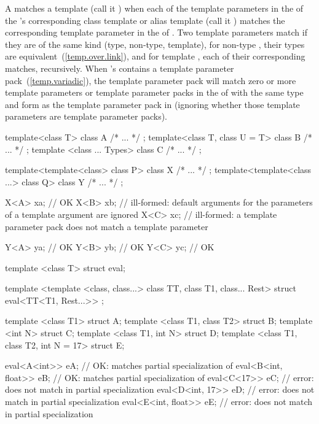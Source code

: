 \pnum A  matches a template
 (call it ) when each of the template
parameters in the  of the
's corresponding class template or alias template (call
it ) matches the corresponding template parameter in the
 of . 
Two template parameters match if they are of the same kind (type, non-type, template),
for non-type , their types are
equivalent~(\ref{temp.over.link}), and for template ,
each of their corresponding  matches, recursively.
When 's  contains a template parameter
pack~(\ref{temp.variadic}), the template parameter pack will match zero or more template
parameters or template parameter packs in the  of
 with the same type and form as the template parameter pack in 
(ignoring whether those template parameters are template parameter packs).

\enterexample
\begin{codeblock}
template<class T> class A { /* ... */ };
template<class T, class U = T> class B { /* ... */ };
template <class ... Types> class C { /* ... */ };

template<template<class> class P> class X { /* ... */ };
template<template<class ...> class Q> class Y { /* ... */ };

X<A> xa;            // OK
X<B> xb;            // ill-formed: default arguments for the parameters of a template argument are ignored
X<C> xc;            // ill-formed: a template parameter pack does not match a template parameter

Y<A> ya;            // OK
Y<B> yb;            // OK
Y<C> yc;            // OK
\end{codeblock}
\exitexample

\enterexample
\begin{codeblock}
template <class T> struct eval;

template <template <class, class...> class TT, class T1, class... Rest>
struct eval<TT<T1, Rest...>> { };

template <class T1> struct A;
template <class T1, class T2> struct B;
template <int N> struct C;
template <class T1, int N> struct D;
template <class T1, class T2, int N = 17> struct E;

eval<A<int>> eA;                // OK: matches partial specialization of 
eval<B<int, float>> eB;         // OK: matches partial specialization of 
eval<C<17>> eC;                 // error:  does not match  in partial specialization
eval<D<int, 17>> eD;            // error:  does not match  in partial specialization
eval<E<int, float>> eE;         // error:  does not match  in partial specialization
\end{codeblock}
\exitexample

